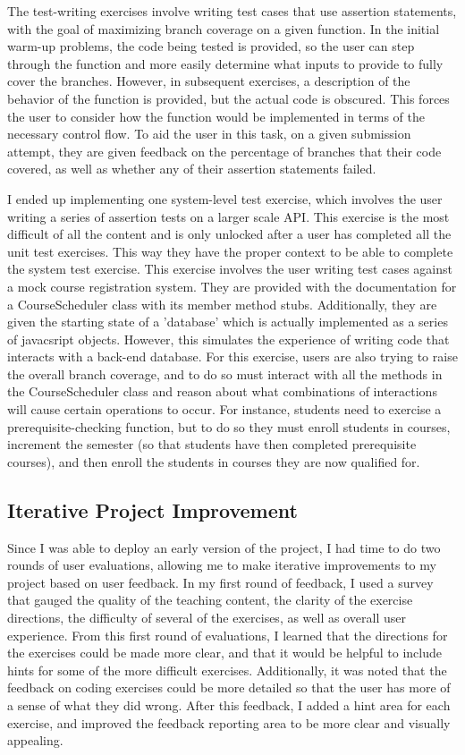 \documentclass[10pt,twocolumn]{article}
\begin{document}
The test-writing exercises involve writing test cases that use assertion statements, with the goal of maximizing branch 
coverage on a given function. In the initial warm-up problems, the code being tested is provided, so the user can step 
through the function and more easily determine what inputs to provide to fully cover the branches. However, in subsequent 
exercises, a description of the behavior of the function is provided, but the actual code is obscured. This forces the 
user to consider how the function would be implemented in terms of the necessary control flow. To aid the user in this 
task, on a given submission attempt, they are given feedback on the percentage of branches that their code covered, as 
well as whether any of their assertion statements failed.

I ended up implementing one system-level test exercise, which involves the user writing a series of assertion tests on a
larger scale API. This exercise is the most difficult of all the content and is only unlocked after a user has completed 
all the unit test exercises. This way they have the proper context to be able to complete the system test exercise. This
exercise involves the user writing test cases against a mock course registration system. They are provided with the documentation 
for a CourseScheduler class with its member method stubs. Additionally, they are given the starting state of a 'database' 
which is actually implemented as a series of javacsript objects. However, this simulates the experience of writing code 
that interacts with a back-end database. For this exercise, users are also trying to raise the overall branch coverage, 
and to do so must interact with all the methods in the CourseScheduler class and reason about what combinations of 
interactions will cause certain operations to occur. For instance, students need to exercise a prerequisite-checking function,
but to do so they must enroll students in courses, increment the semester (so that students have then completed prerequisite 
courses), and then enroll the students in courses they are now qualified for. 


\subsection{Iterative Project Improvement}

Since I was able to deploy an early version of the project, I had time to do two rounds of user evaluations, allowing me 
to make iterative improvements to my project based on user feedback. In my first round of feedback, I used a survey that 
gauged the quality of the teaching content, the clarity of the exercise directions, the difficulty of several of the 
exercises, as well as overall user experience. From this first round of evaluations, I learned that the directions for 
the exercises could be made more clear, and that it would be helpful to include hints for some of the more difficult 
exercises. Additionally, it was noted that the feedback on coding exercises could be more detailed so that the user 
has more of a sense of what they did wrong. After this feedback, I added a hint area for each exercise, and improved the 
feedback reporting area to be more clear and visually appealing. 
\end{document}
